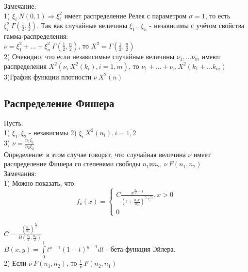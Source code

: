 Замечание:\\
1)  $\xi_{i} ~ N(0, 1) \Rightarrow \xi^{2}_{i}$ имеет распределение Релея с параметром $\sigma = 1$, то есть $\xi^{2}_{i} ~ \Gamma(\frac{1}{2}, \frac{1}{2})$. Так как случайные величины $\xi_{1} ... \xi_{n}$ - независимы с учётом свойства гамма-распределения:\\
$\nu = \xi_{1}^{2} + ... + \xi^{2}_{n} ~ \Gamma(\frac{1}{2}, \frac{n}{2})$, то $X^{2} = \Gamma(\frac{1}{2}, \frac{n}{2})$\\
2) Очевидно, что если независимые случайные величины $\nu_{1}, ... \nu_{m}$ имеют распределения $X^{2} (\nu_{i} ~ X^{2} (k_{i}), i=\overline{1, m})$, то $\nu_{1} + ... + \nu_{n} ~ X^{2}(k_{1} + ... k_{m})$\\
3)График функции плотности $\nu ~ X^{2}(n)$\\
\begin{figure}[H]
	\center{\texttt{[image: 5\_6]}}
\end{figure}

\subsection{Распределение Фишера}
Пусть:\\
1) $\xi_{1}, \xi_{2}$ - независимы
2) $\xi_{i} ~ X^{2}(n_{i}), i = \overline{1,2}$\\
3) $\nu = \frac{n_{1} \xi_{1}}{n_{2} \xi_{2}}$\\

Определение: в этом случае говорят, что случайная величина $\nu$ имеет распределение Фишера со степенями свободы $n_{1} и n_{2}$, $\nu ~ F(n_{1}, n_{2})$\\

Замечания:\\
1) Можно показать, что:\\
\begin{equation}
f_{\nu}(x) = 
\begin{cases}
C \frac{x^{\frac{n_{1}}{2} - 1}}{(1 + \frac{n_{1} x}{n_{2}})^{\frac{n_{1} + n_{2}}{2}}}, x > 0\\
0
\end{cases}
\end{equation}

$C = \frac{(\frac{n_{1}}{n_{2}})^{\frac{n_{1}}{2}}}{B(\frac{n_{1}}{2}, \frac{n_{2}}{2})}$\\
$B(x, y) = \int\limits_{0}^{1} t^{x - 1} (1 - t)^{y - 1} dt$  - бета-функция Эйлера.\\
2) Если $\nu ~ F(n_{1}, n_{2})$, то $\frac{1}{\nu} ~ F(n_{2}, n_{1})$\\

